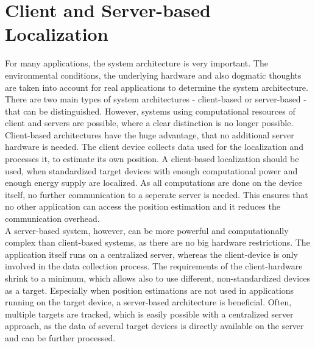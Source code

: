 \section{Client and Server-based Localization}
For many applications, the system architecture is very important. The environmental conditions, the underlying hardware and also dogmatic thoughts are taken into account for real applications to determine the system architecture. There are two main types of system architectures - client-based or server-based - that can be distinguished. However, systems using computational resources of client and servers are possible, where a clear distinction is no longer possible.\\
\noindent\hspace*{5mm}%
Client-based architectures have the huge advantage, that no additional server hardware is needed. The client device collects data used for the localization and processes it, to estimate its own position. A client-based localization should be used, when standardized target devices with enough computational power and enough energy supply are localized. As all computations are done on the device itself, no further communication to a seperate server is needed. This ensures that no other application can access the position estimation and it reduces the communication overhead.\\
\noindent\hspace*{5mm}%
A server-based system, however, can be more powerful and computationally complex than client-based systems, as there are no big hardware restrictions. The application itself runs on a centralized server, whereas the client-device is only involved in the data collection process. The requirements of the client-hardware shrink to a minimum, which allows also to use different, non-standardized devices as a target. Especially when position estimations are not used in applications running on the target device, a server-based architecture is beneficial. Often, multiple targets are tracked, which is easily possible with a centralized server approach, as the data of several target devices is directly available on the server and can be further processed. 


